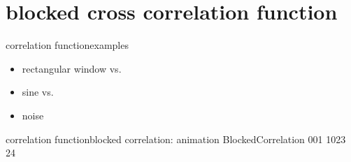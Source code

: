     \section[blocked correlation]{blocked cross correlation function}
        \begin{frame}{correlation function}{examples}
			\begin{itemize}
				\item	rectangular window vs.
				\item	sine vs.
				\item	noise
			\end{itemize}
            \vspace{-5mm}
        \end{frame}	

        \begin{frame}{correlation function}{blocked correlation: animation}
                {BlockedCorrelation}
                {001}
                {1023}
                {24}
        \end{frame}	 

